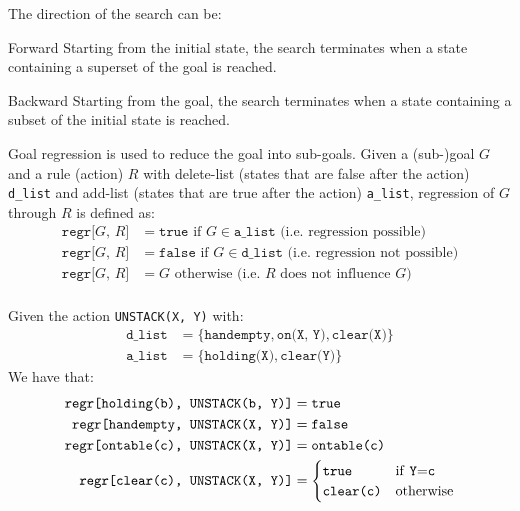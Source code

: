 The direction of the search can be:
\begin{descriptionlist}
    \item[Forward] 
        Starting from the initial state, the search terminates when a state containing a superset of the goal is reached.
    \item[Backward] 
        Starting from the goal, the search terminates when a state containing a subset of the initial state is reached.

        Goal regression is used to reduce the goal into sub-goals.
        Given a (sub-)goal $G$ and a rule (action) $R$ with delete-list (states that are false after the action) \texttt{d\_list}
        and add-list (states that are true after the action) \texttt{a\_list}, regression of $G$ through $R$ is defined as:
        \[
            \begin{split}
                \texttt{regr[$G$, $R$]} &= \texttt{true} \text{ if } G \in \texttt{a\_list} \text{ (i.e. regression possible)} \\
                \texttt{regr[$G$, $R$]} &= \texttt{false} \text{ if } G \in \texttt{d\_list} \text{ (i.e. regression not possible)} \\
                \texttt{regr[$G$, $R$]} &= G \text{ otherwise} \text{ (i.e. $R$ does not influence $G$)} \\
            \end{split}  
        \]

        \begin{example}
            Given the action \texttt{UNSTACK(X, Y)} with:
            \[
                \begin{split}
                    \texttt{d\_list} &= \{ \texttt{handempty}, \texttt{on(X, Y)}, \texttt{clear(X)} \} \\
                    \texttt{a\_list} &= \{ \texttt{holding(X)}, \texttt{clear(Y)} \}
                \end{split}
            \]
            We have that:
            \[
                \begin{split}
                    \texttt{regr[holding(b), UNSTACK(b, Y)]} &= \texttt{true} \\
                    \texttt{regr[handempty, UNSTACK(X, Y)]}  &= \texttt{false} \\
                    \texttt{regr[ontable(c), UNSTACK(X, Y)]} &= \texttt{ontable(c)} \\
                    \texttt{regr[clear(c), UNSTACK(X, Y)]} &= \begin{cases}
                        \texttt{true} & \text{if \texttt{Y}=\texttt{c}} \\
                        \texttt{clear(c)} & \text{otherwise}
                    \end{cases}
                \end{split}  
            \]
        \end{example}
\end{descriptionlist}


